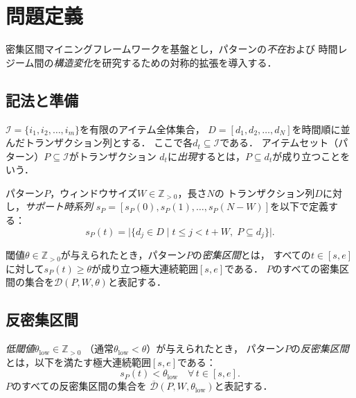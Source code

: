 \section{問題定義}\label{sec:problem}

密集区間マイニングフレームワークを基盤とし，パターンの\emph{不在}および
時間レジーム間の\emph{構造変化}を研究するための対称的拡張を導入する．

\subsection{記法と準備}

$\mathcal{I} = \{i_1, i_2, \ldots, i_m\}$を有限のアイテム全体集合，
$D = [d_1, d_2, \ldots, d_N]$を時間順に並んだトランザクション列とする．
ここで各$d_t \subseteq \mathcal{I}$である．
アイテムセット（パターン）$P \subseteq \mathcal{I}$がトランザクション
$d_t$に\emph{出現}するとは，$P \subseteq d_t$が成り立つことをいう．

\begin{definition}[サポート時系列]\label{def:support_series}
パターン$P$，ウィンドウサイズ$W \in \mathbb{Z}_{>0}$，長さ$N$の
トランザクション列$D$に対し，\emph{サポート時系列}
$s_P = [s_P(0), s_P(1), \ldots, s_P(N-W)]$を以下で定義する：
\begin{equation}
s_P(t) = \bigl|\{d_j \in D \mid t \leq j < t + W,\; P \subseteq d_j\}\bigr|.
\label{eq:support_series}
\end{equation}
\end{definition}

\begin{definition}\label{def:dense_interval}
閾値$\theta \in \mathbb{Z}_{>0}$が与えられたとき，パターン$P$の\emph{密集区間}とは，
すべての$t \in [s, e]$に対して$s_P(t) \geq \theta$が成り立つ極大連続範囲$[s, e]$である．
$P$のすべての密集区間の集合を$\mathcal{D}(P, W, \theta)$と表記する．
\end{definition}

\subsection{反密集区間}

\begin{definition}[反密集区間]\label{def:anti_dense}
\emph{低閾値}$\theta_{\text{low}} \in \mathbb{Z}_{>0}$
（通常$\theta_{\text{low}} < \theta$）が与えられたとき，
パターン$P$の\emph{反密集区間}とは，以下を満たす極大連続範囲$[s, e]$である：
\begin{equation}
s_P(t) < \theta_{\text{low}} \quad \forall\, t \in [s, e].
\label{eq:anti_dense}
\end{equation}
$P$のすべての反密集区間の集合を
$\overline{\mathcal{D}}(P, W, \theta_{\text{low}})$と表記する．
\end{definition}

